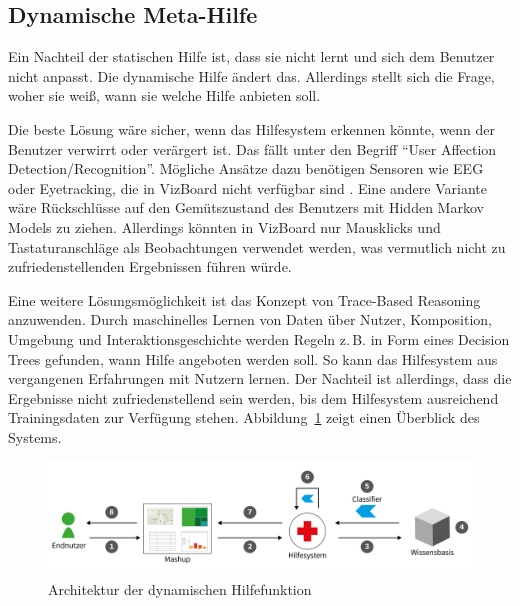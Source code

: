 \documentclass[
	headsepline,
	footsepline,
	fontsize=12pt,
	bibliography=totoc
]{scrbook}
\begin{document}
\subsection{Dynamische Meta-Hilfe}

Ein Nachteil der statischen Hilfe ist, dass sie nicht lernt und sich dem Benutzer nicht anpasst. Die dynamische Hilfe ändert das. Allerdings stellt sich die Frage, woher sie weiß, wann sie welche Hilfe anbieten soll.


Die beste Lösung wäre sicher, wenn das Hilfesystem erkennen könnte, wenn der Benutzer verwirrt oder verärgert ist. Das fällt unter den Begriff \enquote{User Affection Detection/Recognition}. Mögliche Ansätze dazu benötigen Sensoren wie EEG oder Eyetracking, die in VizBoard nicht verfügbar sind \cite{Li2005, Liao2006}. Eine andere Variante wäre Rückschlüsse auf den Gemütszustand des Benutzers mit Hidden Markov Models \cite{Rabiner1986} zu ziehen. Allerdings könnten in VizBoard nur Mausklicks und Tastaturanschläge als Beobachtungen verwendet werden, was vermutlich nicht zu zufriedenstellenden Ergebnissen führen würde.


Eine weitere Lösungsmöglichkeit ist das Konzept von Trace-Based Reasoning \cite{Cordier2013} anzuwenden. Durch maschinelles Lernen \cite{Kotsiantis2007} von Daten über Nutzer, Komposition, Umgebung und Interaktionsgeschichte werden Regeln z.\,B. in Form eines Decision Trees gefunden, wann Hilfe angeboten werden soll. So kann das Hilfesystem aus vergangenen Erfahrungen mit Nutzern lernen. Der Nachteil ist allerdings, dass die Ergebnisse nicht zufriedenstellend sein werden, bis dem Hilfesystem ausreichend Trainingsdaten zur Verfügung stehen. Abbildung~\ref{figure:architektur-dynhilfe} zeigt einen Überblick des Systems.

\begin{figure}[htbp]
   \centering
   \includegraphics[width=\textwidth]{images/konzeption-architektur-dynhilfe.png}
   \caption{Architektur der dynamischen Hilfefunktion}
   \label{figure:architektur-dynhilfe}
\end{figure}
\end{document}
